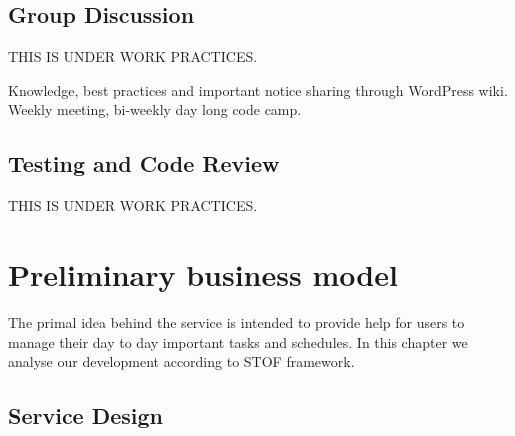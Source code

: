 \documentclass[10pt,a4paper]{report}
\begin{document}
\section{Group Discussion}
{\color{red}THIS IS UNDER WORK PRACTICES.}

Knowledge, best practices and important notice sharing through WordPress wiki. Weekly meeting, bi-weekly day long code camp.

\section{Testing and Code Review}

{\color{red}THIS IS UNDER WORK PRACTICES.}


\chapter{Preliminary business model}

The primal idea behind the service is intended to provide help for users to manage their day to day important tasks and schedules. In this chapter we analyse our development according to STOF framework.

\section{Service Design}
\end{document}
